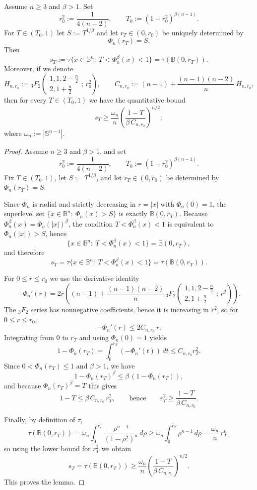 \documentclass[a4paper,10pt]{amsart}
\begin{document}
\begin{numlemma}\label{lem:sT-lower}
Assume $n\ge 3$ and $\beta>1$. Set
\[
r_0^2:=\frac{1}{4(n-2)},\qquad T_0:=(1-r_0^2)^{\beta(n-1)}.
\]
For $T\in(T_0,1)$ let $S:=T^{1/\beta}$ and let $r_T\in(0,r_0)$ be uniquely determined by
\[
\Phi_n(r_T)=S .
\]
Then
\[
s_T:=\tau\{x\in\mathbb{B}^n:\ T<\Phi_n^{\beta}(x)<1\}=\tau(\mathbb{B}(0,r_T)).
\]
Moreover, if we denote
\[
H_{n,r_0}:=
{}_3F_2\!\left(\begin{array}{c}
1,1,2-\frac n2\\[2pt]
2,1+\frac n2
\end{array};\, r_0^2\right),
\qquad
C_{n,r_0}:=(n-1)+\frac{(n-1)(n-2)}{n}\,H_{n,r_0},
\]
then for every $T\in(T_0,1)$ we have the quantitative bound
\[
s_T \ge \frac{\omega_n}{n}\left(\frac{1-T}{\beta\,C_{n,r_0}}\right)^{\!n/2},
\]
where $\omega_n:=|\mathbb S^{n-1}|$.
\end{numlemma}

\begin{proof}
Assume $n\ge 3$ and $\beta>1$, and set
\[
r_0^2:=\frac{1}{4(n-2)},\qquad T_0:=(1-r_0^2)^{\beta(n-1)}.
\]
Fix $T\in(T_0,1)$, let $S:=T^{1/\beta}$, and let $r_T\in(0,r_0)$ be determined by
$\Phi_n(r_T)=S$.

Since $\Phi_n$ is radial and strictly decreasing in $r=|x|$ with $\Phi_n(0)=1$,
the superlevel set $\{x\in\mathbb B^n:\ \Phi_n(x)>S\}$ is exactly $\mathbb B(0,r_T)$.
Because $\Phi_n^\beta(x)=\Phi_n(|x|)^\beta$, the condition
$T<\Phi_n^\beta(x)<1$ is equivalent to $\Phi_n(|x|)>S$, hence
\[
\{x\in\mathbb B^n:\ T<\Phi_n^\beta(x)<1\}=\mathbb B(0,r_T),
\]
and therefore
\[
s_T=\tau\{x\in\mathbb B^n:\ T<\Phi_n^{\beta}(x)<1\}=\tau(\mathbb B(0,r_T)).
\]

For $0\le r\le r_0$ we use the derivative identity
\[
-\Phi_n'(r)=2r\left((n-1)+\frac{(n-1)(n-2)}{n}\,
{}_3F_2\!\left(\begin{array}{c}1,1,2-\frac n2\\ 2,1+\frac n2\end{array};\,r^2\right)\right).
\]
The ${}_3F_2$ series has nonnegative coefficients, hence it is increasing in $r^2$,
so for $0\le r\le r_0$,
\[
-\Phi_n'(r)\le 2C_{n,r_0}\,r.
\]
Integrating from $0$ to $r_T$ and using $\Phi_n(0)=1$ yields
\[
1-\Phi_n(r_T)=\int_0^{r_T}(-\Phi_n'(t))\,dt\le C_{n,r_0}r_T^2.
\]
Since $0<\Phi_n(r_T)\le 1$ and $\beta>1$, we have
\[
1-\Phi_n(r_T)^\beta \le \beta\,(1-\Phi_n(r_T)),
\]
and because $\Phi_n(r_T)^\beta=T$ this gives
\[
1-T \le \beta\,C_{n,r_0}\,r_T^2,
\qquad\text{hence}\qquad
r_T^2\ge \frac{1-T}{\beta\,C_{n,r_0}}.
\]

Finally, by definition of $\tau$,
\[
\tau(\mathbb B(0,r_T))
=
\omega_n\int_0^{r_T}\frac{\rho^{n-1}}{(1-\rho^2)^n}\,d\rho
\ge
\omega_n\int_0^{r_T}\rho^{n-1}\,d\rho
=
\frac{\omega_n}{n}\,r_T^n,
\]
so using the lower bound for $r_T^2$ we obtain
\[
s_T=\tau(\mathbb B(0,r_T))
\ge \frac{\omega_n}{n}\left(\frac{1-T}{\beta\,C_{n,r_0}}\right)^{n/2}.
\]
This proves the lemma.
\end{proof}
\end{document}
